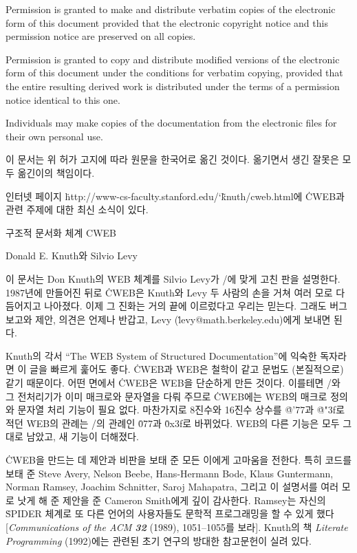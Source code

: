 \bigskip\noindent
Permission is granted to make and distribute verbatim copies of the
electronic form of this document provided that the electronic copyright
notice and this permission notice are preserved on all copies.

\smallskip\noindent
Permission is granted to copy and distribute modified versions of the
electronic form of this document under the conditions for verbatim copying,
provided that the entire resulting derived work is distributed under the terms
of a permission notice identical to this one.

\smallskip\noindent
Individuals may make copies of the documentation from the electronic files
for their own personal use.

\bigskip\noindent
이 문서는 위 허가 고지에 따라 원문을 한국어로 옮긴 것이다. 옮기면서 생긴
잘못은 모두 옮긴이의 책임이다.

\smallskip\noindent
인터넷 페이지 \.{http://www-cs-faculty.stanford.edu/\char`\~knuth/cweb.html}에
\.{CWEB}과 관련 주제에 대한 최신 소식이 있다.

 \titletrue\eject

\titletrue
\centerline{\titlefont 구조적 문서화 체계 {\ttitlefont CWEB}}

\centerline{\authorfont Donald E. Knuth와 Silvio Levy}

\noindent
이 문서는 Don Knuth의 \.{WEB} 체계를 Silvio Levy가 \CEE/에 맞게 고친 판을
설명한다. 1987년에 만들어진 뒤로 \.{CWEB}은 Knuth와 Levy 두 사람의 손을 거쳐
여러 모로 다듬어지고 나아졌다. 이제 그 진화는 거의 끝에 이르렀다고 우리는
믿는다. 그래도 버그 보고와 제안, 의견은 언제나 반갑고, Levy
(\.{levy@math.berkeley.edu})에게 보내면 된다.

Knuth의 각서 ``The \.{WEB} System of Structured Documentation''에 익숙한
독자라면 이 글을 빠르게 훑어도 좋다. \.{CWEB}과 \.{WEB}은 철학이 같고 문법도
(본질적으로) 같기 때문이다. 어떤 면에서 \.{CWEB}은 \.{WEB}을 단순하게 만든
것이다. 이를테면 \CEE/와 그 전처리기가 이미 매크로와 문자열을 다뤄 주므로
\.{CWEB}에는 \.{WEB}의 매크로 정의와 문자열 처리 기능이 필요 없다.
마찬가지로 8진수와 16진수 상수를 \.{@'77}과 \.{@"3f}로 적던 \.{WEB}의 관례는
\CEE/의 관례인 \.{077}과 \.{0x3f}로 바뀌었다. \.{WEB}의 다른 기능은 모두
그대로 남았고, 새 기능이 더해졌다.

\.{CWEB}을 만드는 데 제안과 비판을 보태 준 모든 이에게 고마움을 전한다.
특히 코드를 보태 준 Steve Avery, Nelson Beebe, Hans-Hermann Bode,
Klaus Guntermann, Norman Ramsey, Joachim Schnitter, Saroj Mahapatra,
그리고 이 설명서를 여러 모로 낫게 해 준 제안을 준 Cameron Smith에게 깊이
감사한다. Ramsey는 자신의 \.{SPIDER} 체계로 또 다른 언어의 사용자들도 문학적
프로그래밍을 할 수 있게 했다 [{\sl Communications of the ACM\/ \bf32} (1989),
1051--1055를 보라]. Knuth의 책 {\sl Literate Programming\/} (1992)에는 관련된
초기 연구의 방대한 참고문헌이 실려 있다.

